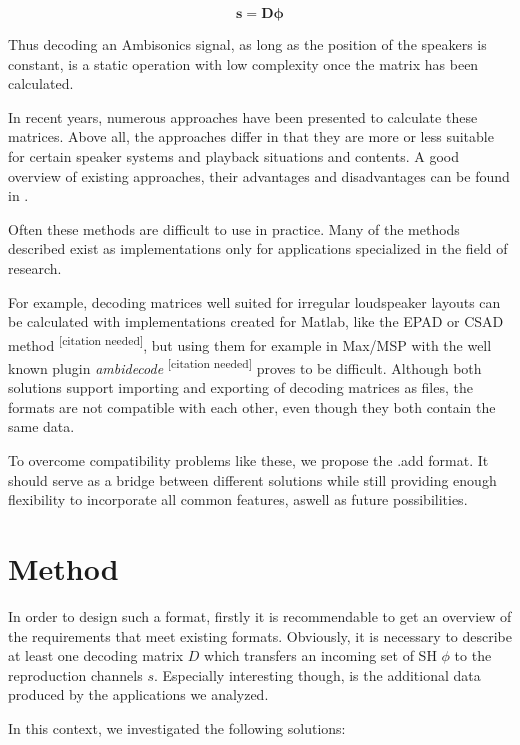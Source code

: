 \documentclass[a4paper, 10pt, twocolumn]{article}
\newcommand{\citationneeded}[1][]{\textsuperscript{\color{black} [citation needed]}}
\begin{document}
\begin{equation}
    \boldsymbol{s}=\boldsymbol{D} \boldsymbol{\phi}
\end{equation}

Thus decoding an Ambisonics signal, as long as the position of the speakers is constant, is a static operation with low complexity once the matrix has been calculated.

In recent years, numerous approaches have been presented to calculate these matrices. Above all, the approaches differ in that they are more or less suitable for certain speaker systems and playback situations and contents. A good overview of existing approaches, their advantages and disadvantages can be found in \cite{allradepadcomp} \cite{unstablemmd} \cite{allrad} \cite{csad} \cite{epad}.

Often these methods are difficult to use in practice. Many of the methods described exist as implementations only for applications specialized in the field of research. 

For example, decoding matrices well suited for irregular loudspeaker layouts can be calculated with implementations created for Matlab, like the EPAD \cite{epad} or CSAD \cite{csad} method \citationneeded{}, but using them for example in Max/MSP with the well known plugin \textit{ambidecode\texttildelow} \citationneeded{} proves to be difficult. Although both solutions support importing and exporting of decoding matrices as files, the formats are not compatible with each other, even though they both contain the same data.

To overcome compatibility problems like these, we propose the .add format. It should serve as a bridge between different solutions while still providing enough flexibility to incorporate all common features, aswell as future possibilities.

\section{Method} \label{sec:Method}

In order to design such a format, firstly it is recommendable to get an overview of the requirements that meet existing formats. Obviously, it is necessary to describe at least one decoding matrix $ D $ which transfers an incoming set of SH $ \phi $ to the reproduction channels $ s $. Especially interesting though, is the additional data produced by the applications we analyzed.

In this context, we investigated the following solutions:
\end{document}
